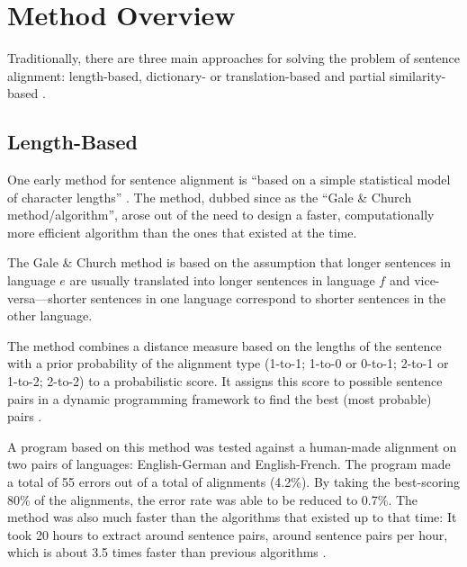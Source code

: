 \section{Method Overview}
\label{sec:overview_senalign}
Traditionally, there are three main approaches for solving the problem of sentence alignment:  length-based, dictionary- or translation-based and partial similarity-based \autocite{hunalign}. 

\subsection{Length-Based}
One early method for sentence alignment is %
\enquote{based on a simple statistical model of character lengths} \autocite{gale-church-1991-program}. The method, dubbed since as the \enquote{Gale \& Church method/algorithm}, arose out of the need to design a faster, computationally more efficient algorithm than the ones that existed at the time\footnotemark.


The Gale \& Church method is based on the assumption that longer sentences in language \(e\) are usually translated into longer sentences in language \(f\) and vice-versa---shorter sentences in one language correspond to shorter sentences in the other language.

The method combines a distance measure based on the lengths of the sentence with a prior probability of the alignment type (1-to-1; 1-to-0 or 0-to-1; 2-to-1 or 1-to-2; 2-to-2) to a probabilistic score. 
It assigns this score to possible sentence pairs in a dynamic programming framework to find the best (most probable) pairs \autocite[57]{koehn2009}. 

A program based on this method was tested against a human-made alignment on two pairs of languages: English-German and English-French. 
The program made a total of 55 errors out of a total of  alignments (4.2\%). 
By taking the best-scoring 80\% of the alignments, the error rate was able to be reduced to 0.7\%.
The method was also much faster than the algorithms that existed up to that time: 
It took 20 hours to extract around  sentence pairs, around  sentence pairs per hour, which is about 3.5 times faster than previous algorithms \autocite{gale-church-1991-program}.

